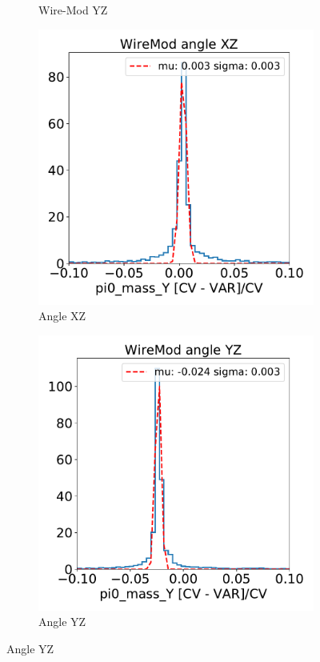\documentclass[a4paper]{article}
\begin{document}
\begin{figure}[H]
\begin{center}
\begin{subfigure}[b]{0.24\textwidth}
    \caption{\label{fig:detsys:pi0mass:WMYZ}Wire-Mod YZ}
    \end{subfigure}
    \begin{subfigure}[b]{0.24\textwidth}
    \centering
    \includegraphics[width=1.00\textwidth]{detsys/pi0/pi0_mass_Y_1d_03232020_WireMod_angle_XZ.pdf}
    \caption{\label{fig:detsys:pi0mass:WAXZ}Angle XZ}
    \end{subfigure}
    \begin{subfigure}[b]{0.24\textwidth}
    \centering
    \includegraphics[width=1.00\textwidth]{detsys/pi0/pi0_mass_Y_1d_03232020_WireMod_angle_YZ.pdf}
    \caption{\label{fig:detsys:pi0mass:WMAYZ}Angle YZ}
    \end{subfigure}     
    

\end{center}
\end{figure}
\end{document}
